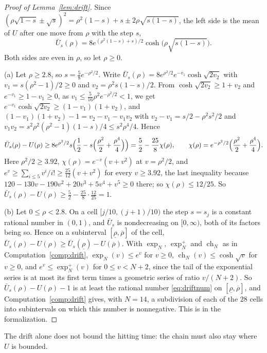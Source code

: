 \documentclass[12pt]{amsart}
\theoremstyle{definition}
\numberwithin{equation}{section}
\newcommand{\ch}{\operatorname{ch}}
\begin{document}
\begin{proof}[Proof of Lemma~\ref{lem:drift}]
Since $(\rho\sqrt{1-s}\pm\sqrt s)^2=\rho^2(1-s)+s\pm2\rho\sqrt{s(1-s)}$, the left side is the mean of $U$ after one move from $\rho$ with the step $s$,
\[
\bar U_s(\rho)=8e^{(\rho^2(1-s)+s)/2}\cosh\bigl(\rho\sqrt{s(1-s)}\bigr).
\]
Both sides are even in $\rho$, so let $\rho\ge0$.

(a) Let $\rho\ge2.8$, so $s=\frac58e^{-\rho^2/2}$. Write $\bar U_s(\rho)=8e^{\rho^2/2}e^{-v_1}\cosh\sqrt{2v_2}$ with $v_1=s(\rho^2-1)/2\ge0$ and $v_2=\rho^2s(1-s)/2$. From $\cosh\sqrt{2v_2}\ge1+v_2$ and $e^{-v_1}\ge1-v_1\ge0$, as $v_1\le\frac5{16}\rho^2e^{-\rho^2/2}<1$, we get $e^{-v_1}\cosh\sqrt{2v_2}\ge(1-v_1)(1+v_2)$, and $(1-v_1)(1+v_2)-1=v_2-v_1-v_1v_2$ with $v_2-v_1=s/2-\rho^2s^2/2$ and $v_1v_2=s^2\rho^2(\rho^2-1)(1-s)/4\le s^2\rho^4/4$. Hence
\[
\bar U_s(\rho)-U(\rho)\ge8e^{\rho^2/2}s\Bigl(\frac12-s\Bigl(\frac{\rho^2}2+\frac{\rho^4}4\Bigr)\Bigr)=\frac52-\frac{25}8\chi(\rho),\qquad\chi(\rho)=e^{-\rho^2/2}\Bigl(\frac{\rho^2}2+\frac{\rho^4}4\Bigr).
\]
Here $\rho^2/2\ge3.92$, $\chi(\rho)=e^{-v}(v+v^2)$ at $v=\rho^2/2$, and $e^v\ge\sum_{i\le5}v^i/i!\ge\frac{25}{12}(v+v^2)$ for every $v\ge3.92$, the last inequality because $120-130v-190v^2+20v^3+5v^4+v^5\ge0$ there; so $\chi(\rho)\le12/25$. So $\bar U_s(\rho)-U(\rho)\ge\frac52-\frac{25}8\cdot\frac{12}{25}=1$.

(b) Let $0\le\rho<2.8$. On a cell $[j/10,(j+1)/10)$ the step $s=s_j$ is a constant rational number in $(0,1)$, and $\bar U_s$ is nondecreasing on $[0,\infty)$, both of its factors being so. Hence on a subinterval $[\underline\rho,\overline\rho]$ of the cell, $\bar U_s(\rho)-U(\rho)\ge\bar U_s(\underline\rho)-U(\overline\rho)$. With $\exp_N$, $\exp_N^+$ and $\ch_N$ as in Computation~\ref{comp:drift}, $\exp_N(v)\le e^v$ for $v\ge0$, $\ch_N(v)\le\cosh\sqrt v$ for $v\ge0$, and $e^v\le\exp_N^+(v)$ for $0\le v<N+2$, since the tail of the exponential series is at most its first term times a geometric series of ratio $v/(N+2)$. So $\bar U_s(\rho)-U(\rho)-1$ is at least the rational number \eqref{eq:driftnum} on $[\underline\rho,\overline\rho]$, and Computation~\ref{comp:drift} gives, with $N=14$, a subdivision of each of the $28$ cells into subintervals on which this number is nonnegative. This is  in the formalization.
\end{proof}

The drift alone does not bound the hitting time: the chain must also stay where $U$ is bounded.
\end{document}
